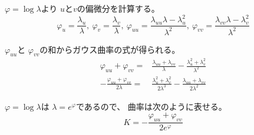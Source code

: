\documentclass[12pt,b5paper]{ltjsarticle}
\begin{document}
\begin{enumerate}
      $\varphi = \log{\lambda}$より
      $u$と$v$の偏微分を計算する。
      \begin{equation}
       \varphi_{u} = \frac{\lambda_{u}}{\lambda}
        ,\
       \varphi_{v} = \frac{\lambda_{v}}{\lambda}
        ,\
       \varphi_{uu} = \frac{\lambda_{uu}\lambda -\lambda_{u}^2}{\lambda^2}
        ,\
       \varphi_{vv} = \frac{\lambda_{vv}\lambda -\lambda_{v}^2}{\lambda^2}
      \end{equation}

      $\varphi_{uu}$と
      $\varphi_{vv}$の和からガウス曲率の式が得られる。
      \begin{align}
       \varphi_{uu} + \varphi_{vv}
         =& \frac{\lambda_{uu}+ \lambda_{vv}}{\lambda}
         - \frac{\lambda_{u}^2 + \lambda_{v}^2}{\lambda^2}\\
       -\frac{\varphi_{uu} + \varphi_{vv}}{2\lambda}
         =& \frac{\lambda_{u}^2 + \lambda_{v}^2}{2\lambda^3}
           - \frac{\lambda_{uu}+ \lambda_{vv}}{2\lambda^2}
      \end{align}

      $\varphi = \log{\lambda}$は
      $\lambda = e^{\varphi}$であるので、
      曲率は次のように表せる。
      \begin{equation}
       K = -\frac{\varphi_{uu} + \varphi_{vv}}{2e^{\varphi}}
      \end{equation}


      \hrulefill

\end{enumerate}



\hrulefill
\end{document}
